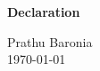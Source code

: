 \thispagestyle{empty}

\begin{center}
{\Large \textbf{Declaration}}\\[1.5cm]

\blindtext
\end{center}

\vspace{2cm}

\begin{flushright}
 Prathu Baronia \\
 \today
\end{flushright}

\afterpage{\blankpage}
\clearpage
